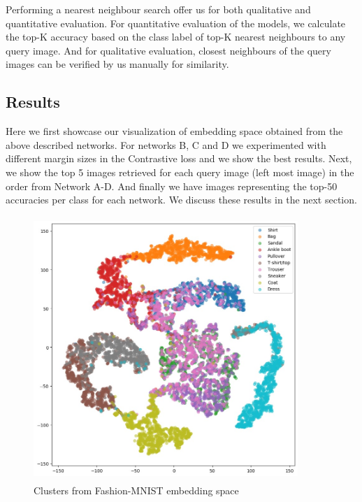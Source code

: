 \documentclass{article}
\begin{document}
Performing a nearest neighbour search offer us for both qualitative and quantitative evaluation. For quantitative evaluation of the models, we calculate the top-K accuracy based on the class label of top-K nearest neighbours to any query image. And for qualitative evaluation, closest neighbours of the query images can be verified by us manually for similarity.


\subsection{Results}
Here we first showcase our visualization of embedding space obtained from the above described networks. For networks B, C and D we experimented with different margin sizes in the Contrastive loss and we show the best results. Next, we show the top 5 images retrieved for each query image (left most image) in the order from Network A-D. And finally we have images representing the top-50 accuracies per class for each network. We discuss these results in the next section.

\begin{figure}[H]
  \centering
    \includegraphics[width=10cm,height=10cm,keepaspectratio]{fashionMnist_viz.jpeg}
    \caption{Clusters from Fashion-MNIST embedding space}
    \label{fig:fmnist}
\end{figure}
\end{document}
